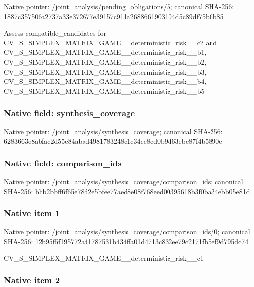 \documentclass[10pt,a4paper]{article}
\begin{document}
Native pointer: /joint\_analysis/pending\_obligations/5; canonical SHA-256: 1887c357506a2737a33e3726\allowbreak{}77e39157c911a26886619031\allowbreak{}04d5c89df75b6b85


Assess compatible\_candidates for CV\_S\_SIMPLEX\_MATRIX\_GAME\allowbreak{}\_\_deterministic\_risk\_\_c2 and CV\_S\_SIMPLEX\_MATRIX\_GAME\allowbreak{}\_\_deterministic\_risk\_\_b1\allowbreak{}, CV\_S\_SIMPLEX\_MATRIX\_GAME\allowbreak{}\_\_deterministic\_risk\_\_b2\allowbreak{}, CV\_S\_SIMPLEX\_MATRIX\_GAME\allowbreak{}\_\_deterministic\_risk\_\_b3\allowbreak{}, CV\_S\_SIMPLEX\_MATRIX\_GAME\allowbreak{}\_\_deterministic\_risk\_\_b4\allowbreak{}, CV\_S\_SIMPLEX\_MATRIX\_GAME\allowbreak{}\_\_deterministic\_risk\_\_b5


\subsubsection{Native field: synthesis\_coverage}


Native pointer: /joint\_analysis/synthesis\_coverage; canonical SHA-256: 6283663e8abfac2d55e84aba\allowbreak{}d4981783248c1c34ce8cd0b9\allowbreak{}d63ebe87f4b5890e



\subsubsection{Native field: comparison\_ids}


Native pointer: /joint\_analysis/synthesi\allowbreak{}s\_coverage/comparison\_id\allowbreak{}s; canonical SHA-256: bbb2bbff6f65e78d2e5bfee7\allowbreak{}7aed8e08f768eed00395618b\allowbreak{}3f0ba24ebb05e81d



\subsubsection{Native item 1}


Native pointer: /joint\_analysis/synthesi\allowbreak{}s\_coverage/comparison\_id\allowbreak{}s/0; canonical SHA-256: 12b95f5f195772a41787531b\allowbreak{}434ffa01d4713c832ee79c21\allowbreak{}71fb5ef9d795dc74


CV\_S\_SIMPLEX\_MATRIX\_GAME\allowbreak{}\_\_deterministic\_risk\_\_c1


\subsubsection{Native item 2}
\end{document}

